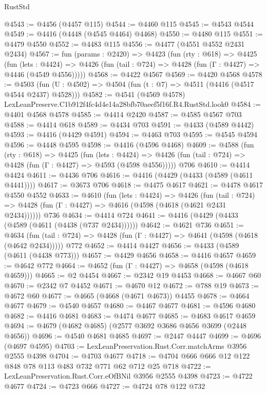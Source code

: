 \begin{lexlean}{RustStd}
\begin{coremodule}
@4543 := @4456 (@4457 @115)
@4544 := @4460 @115
@4545 := @4543 @4544
@4549 := @4416 (@4448 (@4545 @4464) @4468)
@4550 := @4480 @115
@4551 := @4479 @4550
@4552 := @4483 @115
@4556 := @4477 (@4551 @4552 @2431 @2434)
@4567 := fun (params : @2420) =>
  @4423
    (fun (rty : @618) =>
    @4425
      (fun (lets : @4424) =>
      @4426 (fun (tail : @724) => @4428 (fun (Γ : @4427) => @4446 (@4549 @4556)))))
@4568 := @4422 @4567
@4569 := @4420 @4568
@4578 := @4503 (fun (U : @4502) => @4504 (fun (t : @7) => @4511 (@4416 (@4517 @4544 @2437) @4528)))
@4582 := @4541 (@4569 @4578) LexLeanPreserve.C1b912f4fc4d4e14a28bfb70aeef5f16f.R4.RustStd.look0
@4584 := @4401 @4568 @4578
@4585 := @4414 @2420
@4587 := @4585 @4567 @703
@4588 := @4414 @618
@4589 := @4434 @703
@4591 := @4433 (@4589 @4442)
@4593 := @4416 (@4429 @4591)
@4594 := @4463 @703
@4595 := @4545 @4594
@4596 := @4448 @4595
@4598 := @4416 (@4596 @4468)
@4609 := @4588
    (fun (rty : @618) =>
    @4425
      (fun (lets : @4424) =>
      @4426 (fun (tail : @724) => @4428 (fun (Γ : @4427) => @4593 (@4598 @4556)))))
    @706
@4610 := @4414 @4424
@4611 := @4436 @706
@4616 := @4416 (@4429 (@4433 (@4589 (@4611 @4441))))
@4617 := @3673 @706
@4618 := @4475 @4617
@4621 := @4478 @4617 @4550 @4552
@4633 := @4610
    (fun (lets : @4424) =>
    @4426
      (fun (tail : @724) => @4428 (fun (Γ : @4427) => @4616 (@4598 (@4618 (@4621 @2431 @2434))))))
    @736
@4634 := @4414 @724
@4641 := @4416 (@4429 (@4433 (@4589 (@4611 (@4438 (@737 @2434))))))
@4642 := @4621 @736
@4651 := @4634
    (fun (tail : @724) => @4428 (fun (Γ : @4427) => @4641 (@4598 (@4618 (@4642 @2434)))))
    @772
@4652 := @4414 @4427
@4656 := @4433 (@4589 (@4611 (@4438 @773)))
@4657 := @4429 @4656
@4658 := @4416 @4657
@4659 := @4642 @772
@4664 := @4652 (fun (Γ : @4427) => @4658 (@4598 (@4618 @4659)))
@4665 := @2 @4454
@4667 := @2342 @19 @4453
@4668 := @4667 @60
@4670 := @2342 @7 @4452
@4671 := @4670 @12
@4672 := @788 @19
@4673 := @4672 @60
@4677 := @4665 (@4668 (@4671 @4673)) @4455
@4678 := @4664 @4677
@4679 := @4540 @4657
@4680 := @4467 @4677
@4681 := @4596 @4680
@4682 := @4416 @4681
@4683 := @4474 @4677
@4685 := @4683 @4617 @4659
@4694 := @4679 (@4682 @4685) (@2577 @3692 @3686 @4656 @3699 (@2448 @4656))
@4696 := @4540 @4681 @4685
@4697 := @2447 @4447
@4699 := @4696 (@4697 @4595)
@4703 := LexLeanPreservation.Rust.Corr.matchArms @3956 @2555 @4398
@4704 := @4703 @4677
@4718 := @4704 @666 @666 @12 @122 @848 @78 @113 @483 @732 @771 @62 @712 @25 @718
@4722 := LexLeanPreservation.Rust.Corr.eOfBNil @3956 @2555 @4398
@4723 := @4722 @4677
@4724 := @4723 @666
@4727 := @4724 @78 @122 @732

\end{coremodule}
\end{lexlean}
